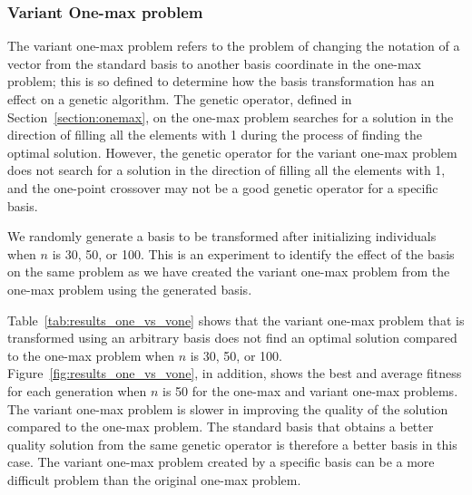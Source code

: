 \subsubsection{Variant One-max problem} \label{section:vonemax}
The variant one-max problem refers to the problem of changing the notation of a vector from the standard basis to another basis coordinate in the one-max problem;
this is so defined to determine how the basis transformation has an effect on a genetic algorithm.
The genetic operator, defined in Section~\ref{section:onemax}, on the one-max problem searches for a solution in the direction of filling all the elements with 1 during the process of finding the optimal solution.
However, the genetic operator for the variant one-max problem does not search for a solution in the direction of filling all the elements with 1, and the one-point crossover may not be a good genetic operator for a specific basis.

We randomly generate a basis to be transformed after initializing individuals when $ n $ is 30, 50, or 100.
This is an experiment to identify the effect of the basis on the same problem as we have created the variant one-max problem from the one-max problem using the generated basis.

Table~\ref{tab:results_one_vs_vone} shows that the variant one-max problem that is transformed using an arbitrary basis does not find an optimal solution compared to the one-max problem when $n$ is 30, 50, or 100.
Figure~\ref{fig:results_one_vs_vone}, in addition, shows the best and average fitness for each generation when $n$ is 50 for the one-max and variant one-max problems.
The variant one-max problem is slower in improving the quality of the solution compared to the one-max problem.
The standard basis that obtains a better quality solution from the same genetic operator is therefore a better basis in this case.
The variant one-max problem created by a specific basis can be a more difficult problem than the original one-max problem.

